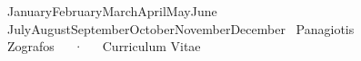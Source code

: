 \documentclass[11pt, a4paper]{awesome-cv}
\begin{document}
\makecvheader

\newcommand{\monthyear}{%
  \ifcase\month\or January\or February\or March\or April\or May\or June\or
  July\or August\or September\or October\or November\or December\fi\ \the\year}

\makecvfooter
  {\monthyear}
  {Panagiotis Zografos~~~·~~~Curriculum Vitae}
  {\thepage}










\end{document}
